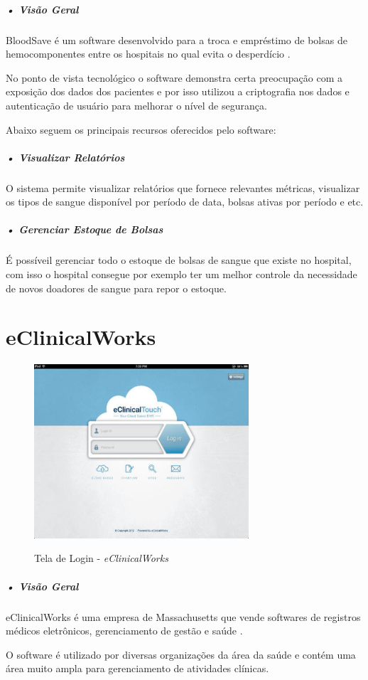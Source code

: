 \documentclass[portuguese,oneside]{tcc}
\begin{document}
\subparagraph{• Visão Geral}
BloodSave é um software desenvolvido para a troca e empréstimo de bolsas de hemocomponentes entre os hospitais no qual evita o desperdício \cite{SANGUE}.
 
No ponto de vista tecnológico o software demonstra certa preocupação com a exposição dos dados dos pacientes e por isso utilizou a criptografia nos dados e autenticação de usuário para melhorar o nível de segurança.

Abaixo seguem os principais recursos oferecidos pelo software:

\subparagraph{• Visualizar Relatórios}
O sistema permite visualizar relatórios que fornece relevantes métricas, visualizar os tipos de sangue disponível por período de data, bolsas ativas por período e etc\cite{SANGUE}.

\subparagraph{• Gerenciar Estoque de Bolsas}
É possíveil gerenciar todo o estoque de bolsas de sangue que existe no hospital, com isso o hospital consegue por exemplo ter um melhor controle da necessidade de novos doadores de sangue para repor o estoque. 


\section{eClinicalWorks}

\begin{figure}[htp]
\centering
\caption{Tela de Login - \textit{eClinicalWorks}}
\includegraphics[width=8cm]{eclinicalworks}
\label{fig:eclinicalworks}
\end{figure}

\subparagraph{• Visão Geral}
eClinicalWorks é uma empresa de Massachusetts que vende softwares de registros médicos eletrônicos, gerenciamento de gestão e saúde \cite{ECLINICAL}.
 
O software é utilizado por diversas organizações da área da saúde e contém uma área muito ampla para gerenciamento de atividades clínicas.
\end{document}
